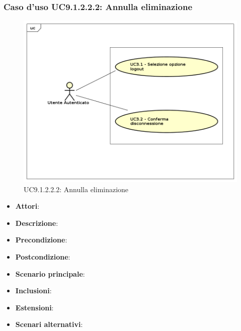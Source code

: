 				\subsubsection{Caso d'uso UC9.1.2.2.2: Annulla eliminazione}
				\label{UC9.1.2.2.2}
				\begin{figure}[h]
					\centering
				\includegraphics[scale=0.7,keepaspectratio]{UML/UC9.png}
					\caption{UC9.1.2.2.2: Annulla eliminazione}
				\end{figure}
				\FloatBarrier
				\begin{itemize}
					\item \textbf{Attori}: 
					\item \textbf{Descrizione}: 
					\item \textbf{Precondizione}: 
					\item \textbf{Postcondizione}: 
					\item \textbf{Scenario principale}:
					\item \textbf{Inclusioni}:
					\item \textbf{Estensioni}:
					\item \textbf{Scenari alternativi}:
				\end{itemize}
				
